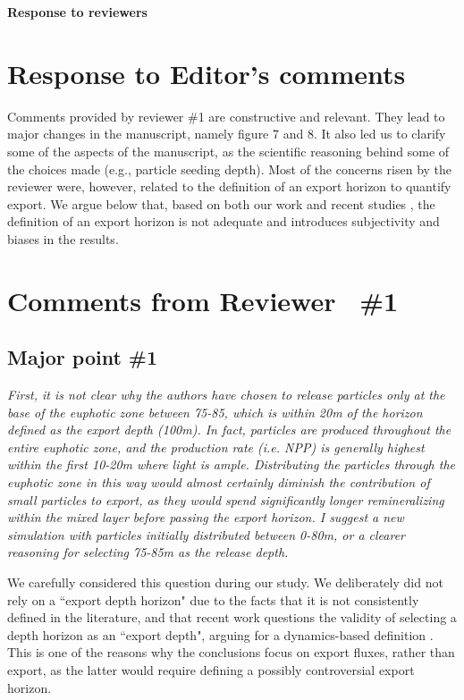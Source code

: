 \documentclass[12pt,letter]{article}
\begin{document}
\begin{center}
\large
\textbf{
Response to reviewers\\}
\end{center}
\small

\section{Response to Editor's comments}

Comments provided by reviewer \#1 are constructive and relevant. They lead to major changes in the manuscript, namely figure 7 and 8. It also led us to clarify some of the aspects of the manuscript, as the scientific reasoning behind some of the choices made (e.g., particle seeding depth). Most of the concerns risen by the reviewer were, however, related to the definition of an export horizon to quantify export. We argue below that, based on both our work and recent studies \citep{Palevsky_2018}, the definition of an export horizon is not adequate and introduces subjectivity and biases in the results.




\section{Comments from Reviewer  \#1}
\subsection*{Major point \#1}
\small
\textit{First, it is not clear why the authors have chosen to release particles only at the base of the euphotic zone between 75-85, which is within 20m of the horizon defined as the export depth (100m). In fact, particles are produced throughout the entire euphotic zone, and the production rate (i.e. NPP) is generally highest within the first 10-20m where light is ample. Distributing the particles through the euphotic zone in this way would almost certainly diminish the contribution of small particles to export, as they would spend significantly longer remineralizing within the mixed layer before passing the export horizon. I suggest a new simulation with particles initially distributed between 0-80m, or a clearer reasoning for selecting 75-85m as the release depth.\\}


We carefully considered this question during our study. We deliberately  did not rely on a ``export depth horizon" due to the facts that it is not consistently defined in the literature, and that recent work questions the validity of selecting a depth horizon as an ``export depth", arguing for a dynamics-based definition \citep{Palevsky_2018}. This is one of the reasons why the conclusions focus on export fluxes, rather than export, as the latter would require defining a possibly controversial export horizon.\\
			
\end{document}

